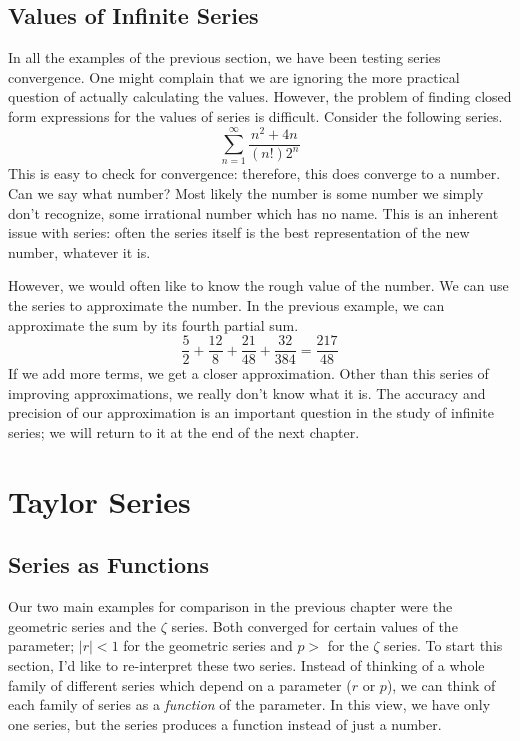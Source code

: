 \documentclass[fleqn,letterpaper]{report}
\begin{document}
\section{Values of Infinite Series}
\label{values-of-series}

In all the examples of the previous section, we have been
testing series convergence.  One might complain that we are
ignoring the more practical question of actually calculating
the values. However, the problem of finding closed form
expressions for the values of series is difficult. Consider
the following series.
\begin{equation*}
\sum_{n=1}^\infty \frac{n^2+4n}{(n!)2^n}
\end{equation*}
This is easy to check for convergence: therefore, this does
converge to a number. Can we say what number? Most likely the
number is some number we simply don't recognize, some
irrational number which has no name. This is an inherent
issue with series: often the series itself is the best
representation of the new number, whatever it is.

However, we would often like to know the rough value of the
number. We can use the series to approximate the number. In
the previous example, we can approximate the sum by its fourth
partial sum.
\begin{equation*}
\frac{5}{2} + \frac{12}{8} + \frac{21}{48} + \frac{32}{384} =
\frac{217}{48}
\end{equation*}
If we add more terms, we get a closer approximation.
Other than this series of improving approximations, we really
don't know what it is. The accuracy and precision of our
approximation is an important question in the study of
infinite series; we will return to it at the end of the next
chapter.

\chapter{Taylor Series}
\label{taylor-series}

\section{Series as Functions}
\label{series-as-functions}

Our two main examples for comparison in the previous chapter
were the geometric series and the $\zeta$ series. Both
converged for certain values of the parameter; $|r|<1$ for the
geometric series and $p > $ for the $\zeta$ series. To start
this section, I'd like to re-interpret these two series.
Instead of thinking of a whole family of different series
which depend on a parameter ($r$ or $p$), we can think of each
family of series as a \emph{function} of the parameter. In
this view, we have only one series, but the series produces a
function instead of just a number.
\end{document}
